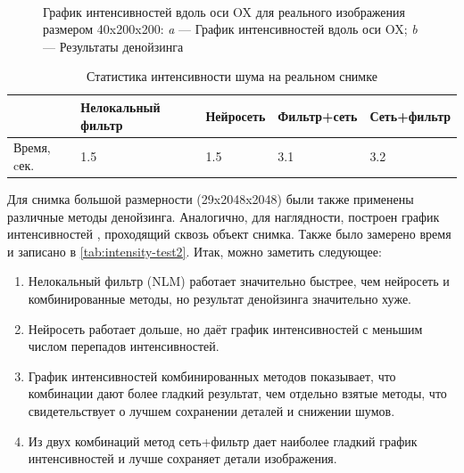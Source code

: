 \begin{figure}[H]
\begin{subfigure}[t]{0.3\textwidth\relax}
	\end{subfigure}
	\\[20pt]
	\captionsetup{justification=centering} %
	\caption{График интенсивностей вдоль оси OX для реального изображения размером 40x200x200: {\itshape a} --- График интенсивностей вдоль оси OX; {\itshape b} --- Результаты денойзинга} 
	\label{fig:intensity-test1}
\end{figure}
\begin{table} [H]%
	\centering\small
	\caption{Статистика интенсивности шума на реальном снимке}%
	\label{tab:intensity-test1}		
	\begin{tabular}{|l|l|l|l|l|}
		\hline
		 &Нелокальный фильтр&Нейросеть&Фильтр+сеть&Сеть+фильтр\\
		\hline	
		Время, cек.
		&1.5&1.5&3.1&3.2\\ \hline
	\end{tabular}
	\normalsize%
\end{table}
\par Для снимка большой размерности (29x2048x2048) были также применены различные методы денойзинга. Аналогично, для наглядности, построен график интенсивностей , проходящий сквозь объект снимка. Также было замерено время и записано в \ref{tab:intensity-test2}. Итак, можно заметить следующее: 
\begin{enumerate}[]
	\item  Нелокальный фильтр (NLM) работает значительно быстрее, чем нейросеть и комбинированные методы, но результат денойзинга значительно хуже.
	\item Нейросеть работает дольше, но даёт график интенсивностей с меньшим числом перепадов интенсивностей.
	\item График интенсивностей комбинированных методов показывает, что комбинации дают более гладкий результат, чем отдельно взятые методы, что свидетельствует о лучшем сохранении деталей и снижении шумов.
	\item Из двух комбинаций метод сеть+фильтр дает наиболее гладкий график интенсивностей и лучше сохраняет детали изображения.
\end{enumerate}
